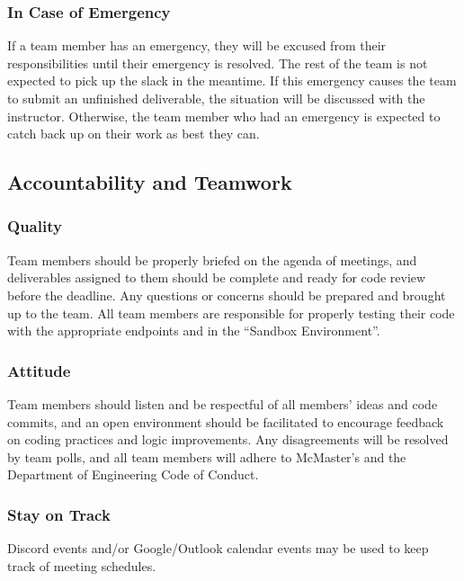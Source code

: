 \documentclass{article}
\begin{document}
\subsubsection*{In Case of Emergency}

If a team member has an emergency, they will be excused from their responsibilities until their emergency is resolved. The rest of the team is not expected to pick up the slack in the meantime. If this emergency causes the team to submit an unfinished deliverable, the situation will be discussed with the instructor. Otherwise, the team member who had an emergency is expected to catch back up on their work as best they can.

\subsection*{Accountability and Teamwork}

\subsubsection*{Quality} 

Team members should be properly briefed on the agenda of meetings, and deliverables assigned to them should be complete and ready for code review before the deadline. Any questions or concerns should be prepared and brought up to the team. All team members are responsible for properly testing their code with the appropriate endpoints and in the “Sandbox Environment”.

\subsubsection*{Attitude}

Team members should listen and be respectful of all members’ ideas and code commits, and an open environment should be facilitated to encourage feedback on coding practices and logic improvements. Any disagreements will be resolved by team polls, and all team members will adhere to McMaster’s and the Department of Engineering Code of Conduct.

\subsubsection*{Stay on Track}

Discord events and/or Google/Outlook calendar events may be used to keep track of meeting schedules.\\
\end{document}
